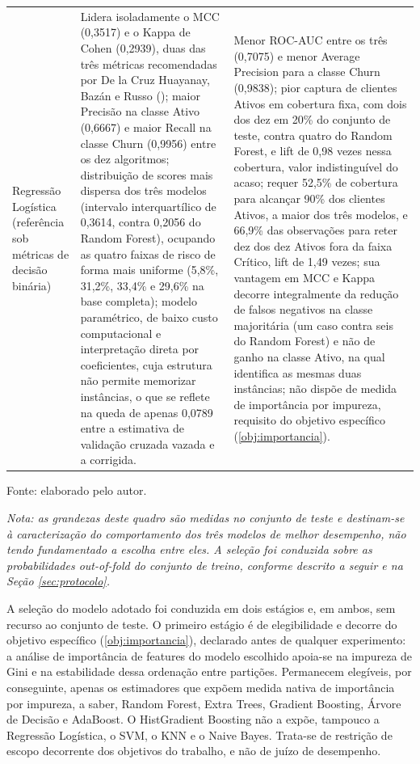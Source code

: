 \begin{longtable}{|>{\raggedright\arraybackslash}p{2.3cm}|>{\raggedright\arraybackslash}p{5.6cm}|>{\raggedright\arraybackslash}p{5.6cm}|}
\hline
Regressão Logística (referência sob métricas de decisão binária) &
Lidera isoladamente o MCC (0,3517) e o Kappa de Cohen (0,2939), duas das três métricas recomendadas por De la Cruz Huayanay, Bazán e Russo (\citeyear{delacruz2025}); maior Precisão na classe Ativo (0,6667) e maior Recall na classe Churn (0,9956) entre os dez algoritmos; distribuição de scores mais dispersa dos três modelos (intervalo interquartílico de 0,3614, contra 0,2056 do Random Forest), ocupando as quatro faixas de risco de forma mais uniforme (5,8\%, 31,2\%, 33,4\% e 29,6\% na base completa); modelo paramétrico, de baixo custo computacional e interpretação direta por coeficientes, cuja estrutura não permite memorizar instâncias, o que se reflete na queda de apenas 0,0789 entre a estimativa de validação cruzada vazada e a corrigida. &
Menor ROC-AUC entre os três (0,7075) e menor Average Precision para a classe Churn (0,9838); pior captura de clientes Ativos em cobertura fixa, com dois dos dez em 20\% do conjunto de teste, contra quatro do Random Forest, e lift de 0,98 vezes nessa cobertura, valor indistinguível do acaso; requer 52,5\% de cobertura para alcançar 90\% dos clientes Ativos, a maior dos três modelos, e 66,9\% das observações para reter dez dos dez Ativos fora da faixa Crítico, lift de 1,49 vezes; sua vantagem em MCC e Kappa decorre integralmente da redução de falsos negativos na classe majoritária (um caso contra seis do Random Forest) e não de ganho na classe Ativo, na qual identifica as mesmas duas instâncias; não dispõe de medida de importância por impureza, requisito do objetivo específico (\ref{obj:importancia}). \\
\end{longtable}
\begin{flushleft}
	\ABNTEXfontereduzida
	\SingleSpacing
	Fonte: elaborado pelo autor.

	\textit{Nota: as grandezas deste quadro são medidas no conjunto de teste e destinam-se à caracterização do comportamento dos três modelos de melhor desempenho, não tendo fundamentado a escolha entre eles. A seleção foi conduzida sobre as probabilidades out-of-fold do conjunto de treino, conforme descrito a seguir e na Seção \ref{sec:protocolo}.}
\end{flushleft}
\addtocounter{table}{-1}
\endgroup

A seleção do modelo adotado foi conduzida em dois estágios e, em ambos, sem recurso ao conjunto de teste. O primeiro estágio é de elegibilidade e decorre do objetivo específico (\ref{obj:importancia}), declarado antes de qualquer experimento: a análise de importância de features do modelo escolhido apoia-se na impureza de Gini e na estabilidade dessa ordenação entre partições. Permanecem elegíveis, por conseguinte, apenas os estimadores que expõem medida nativa de importância por impureza, a saber, Random Forest, Extra Trees, Gradient Boosting, Árvore de Decisão e AdaBoost. O HistGradient Boosting não a expõe, tampouco a Regressão Logística, o SVM, o KNN e o Naive Bayes. Trata-se de restrição de escopo decorrente dos objetivos do trabalho, e não de juízo de desempenho.

